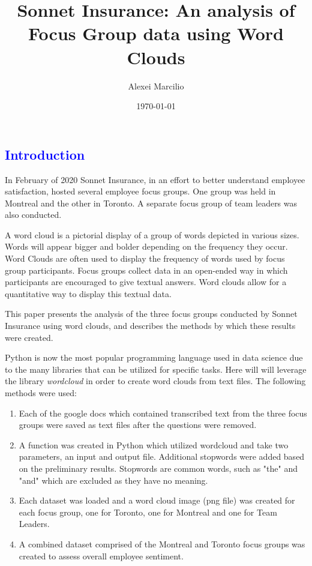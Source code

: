 \documentclass[11pt]{report}
\begin{document}
\title{Sonnet Insurance: An analysis of Focus Group data using Word Clouds}
\author{Alexei Marcilio}
\date{\today}
\maketitle



\newpage

\textcolor{blue}{\section{Introduction}}


In February of 2020 Sonnet Insurance, in an effort to better understand employee satisfaction, hosted several employee focus groups. One group was held in Montreal and the other in Toronto. A separate focus group of team leaders was also conducted.

A word cloud is a pictorial display of a group of words depicted in various sizes. Words will appear bigger and bolder depending on the frequency they occur. Word Clouds are often used to display the frequency of words used by focus group participants. Focus groups collect data in an open-ended way in which participants are encouraged to give textual answers. Word clouds allow for a quantitative way to display this textual data.

This paper presents the analysis of the three focus groups conducted by Sonnet Insurance using word clouds, and describes the methods by which these results were created.



Python is now the most popular programming language used in data science due to the many libraries that can be utilized for specific tasks. Here will will leverage the library \emph{wordcloud} in order to create word clouds from text files.
The following methods were used:

\begin{enumerate}
\item Each of the google docs which contained transcribed text from the three focus groups were saved as text files after the questions were removed.
\item A function was created in Python which utilized wordcloud and take two parameters, an input and output file.
Additional stopwords were added based on the preliminary results. Stopwords are common words, such as "the" and "and" which are excluded as they have no meaning.
\item Each dataset was loaded and a word cloud image (png file) was created for each focus group, one for Toronto, one for Montreal and one for Team Leaders.
\item A combined dataset comprised of the Montreal and Toronto focus groups was created to assess overall employee sentiment.
\end{enumerate}
\end{document}

